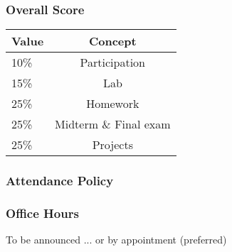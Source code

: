 \documentclass[12pt]{beamer}\usepackage[]{graphicx}\usepackage[]{color}
\begin{document}

\begin{frame}
\frametitle{Overall Score}

\begin{center}
 \begin{tabular}{l c}
  \hline
  Value & Concept \\
  \hline
  10\% & Participation \\
  15\% & Lab \\
  25\% & Homework \\
  25\% & Midterm \& Final exam \\
  25\% & Projects \\
  \hline
 \end{tabular}
\end{center}

\end{frame}


\begin{frame}
\frametitle{Attendance Policy}

\begin{center}
\Huge{}
\end{center}

\end{frame}


\begin{frame}
\frametitle{Office Hours}

To be announced ... or by appointment (preferred)

\end{frame}


\begin{frame}
\begin{center}
\Huge{}
\end{center}
\end{frame}


\begin{frame}
\frametitle{}
\begin{center}
\end{center}
\end{frame}
\end{document}
